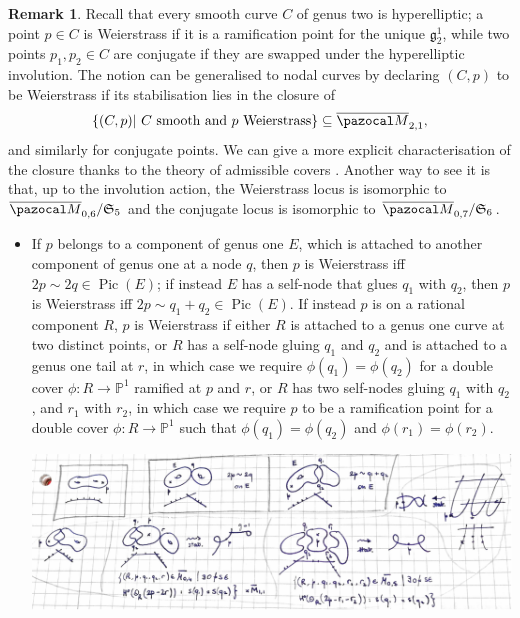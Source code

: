 \documentclass[11pt]{amsart}
\newcommand{\PP}{\mathbb P}
\renewcommand{\to}{\rightarrow}
\newcommand{\oM}{\overline{\pazocal M}}
\newcommand{\Pic}{\operatorname{Pic}}
\theoremstyle{plain}
\theoremstyle{definition}
\newtheorem{rem}[thm]{Remark}
\begin{document}
\begin{rem}
 Recall that every smooth curve $C$ of genus two is hyperelliptic; a point $p\in C$ is Weierstrass if it is a ramification point for the unique $\mathfrak g^1_2$, while two points $p_1,p_2\in C$ are conjugate if they are swapped under the hyperelliptic involution. The notion can be generalised to nodal curves by declaring $(C,p)$ to be Weierstrass if its stabilisation lies in the closure of \[\{(C,p)|\ C\text{ smooth and } p \text{ Weierstrass}\}\subseteq\oM_{2,1},\]
 and similarly for conjugate points. We can give a more explicit characterisation of the closure thanks to the theory of admissible covers \cite[Theorem 5.45]{HM}. Another way to see it is that, up to the involution action, the Weierstrass locus is isomorphic to $\oM_{0,6}/\mathfrak S_5$ and the conjugate locus is isomorphic to  $\oM_{0,7}/\mathfrak S_6$.
 \begin{itemize}[leftmargin=.5cm]
  \item If $p$ belongs to a component of genus one $E$, which is attached to another component of genus one at a node $q$, then $p$ is Weierstrass iff $2p\sim 2q\in\Pic(E)$; if instead $E$ has a self-node that glues $q_1$ with $q_2$, then $p$ is Weierstrass iff $2p\sim q_1+q_2\in\Pic(E)$. If instead $p$ is on a rational component $R$, $p$ is Weierstrass if either $R$  is attached to a genus one curve at two distinct points, or $R$ has a self-node gluing $q_1$ and $q_2$ and is attached to a genus one tail at $r$, in which case we require $\phi(q_1)=\phi(q_2)$ for a double cover $\phi\colon R\to\PP^1$ ramified at $p$ and $r$, or $R$ has two self-nodes gluing $q_1$ with $q_2$, and $r_1$ with $r_2$, in which case we require $p$ to be a ramification point for a double cover $\phi\colon R\to\PP^1$ such that $\phi(q_1)=\phi(q_2)$ and $\phi(r_1)=\phi(r_2)$.
  
  \includegraphics[width=.9\textwidth]{admissible_Weierstrass}
  

\end{itemize}
\end{rem}
\end{document}
